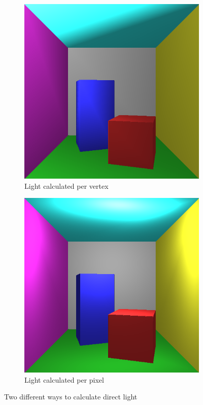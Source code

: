 \documentclass[a4paper,11pt]{article}
\begin{document}
\begin{figure}[h!]
	\centering
	\begin{subfigure}[h]{0.4\linewidth}
		\centering
		\includegraphics[width=\linewidth]{screenshot3.png}
		\caption{Light calculated per vertex}
		\label{fig3}
	\end{subfigure}
	\begin{subfigure}[h!]{0.4\linewidth}
		\centering
		\includegraphics[width=\linewidth]{screenshot4.png}
		\caption{Light calculated per pixel}
		\label{fig4}
	\end{subfigure}
	\caption{Two different ways to calculate direct light}
\end{figure} 
\end{document}
